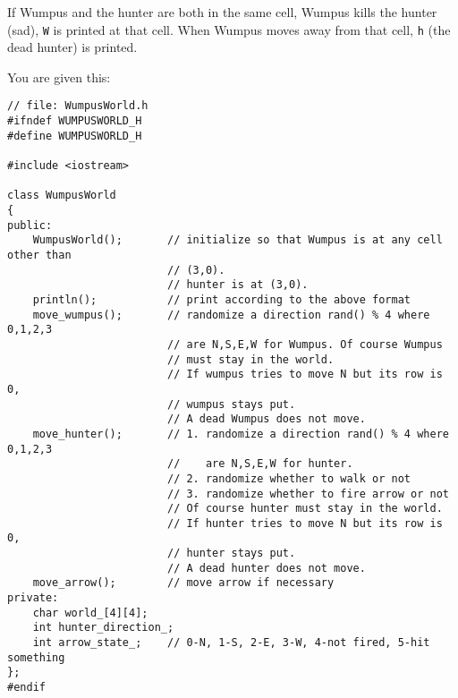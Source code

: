 If Wumpus and the hunter are both in the same cell,
Wumpus kills the hunter (sad),  
\verb!W! is printed at that cell.
When Wumpus moves away from that cell, \verb!h! (the dead hunter)
is printed.

You are given this:
\begin{Verbatim}[frame=single,fontsize=\footnotesize]
// file: WumpusWorld.h
#ifndef WUMPUSWORLD_H
#define WUMPUSWORLD_H

#include <iostream>

class WumpusWorld
{
public:
    WumpusWorld();       // initialize so that Wumpus is at any cell other than
                         // (3,0).
                         // hunter is at (3,0).
    println();           // print according to the above format
    move_wumpus();       // randomize a direction rand() % 4 where 0,1,2,3
                         // are N,S,E,W for Wumpus. Of course Wumpus
                         // must stay in the world.
                         // If wumpus tries to move N but its row is 0,
                         // wumpus stays put.
                         // A dead Wumpus does not move.
    move_hunter();       // 1. randomize a direction rand() % 4 where 0,1,2,3
                         //    are N,S,E,W for hunter.
                         // 2. randomize whether to walk or not
                         // 3. randomize whether to fire arrow or not
                         // Of course hunter must stay in the world.
                         // If hunter tries to move N but its row is 0,
                         // hunter stays put.
                         // A dead hunter does not move.
    move_arrow();        // move arrow if necessary
private:
    char world_[4][4];
    int hunter_direction_;
    int arrow_state_;    // 0-N, 1-S, 2-E, 3-W, 4-not fired, 5-hit something
};
#endif
\end{Verbatim}

